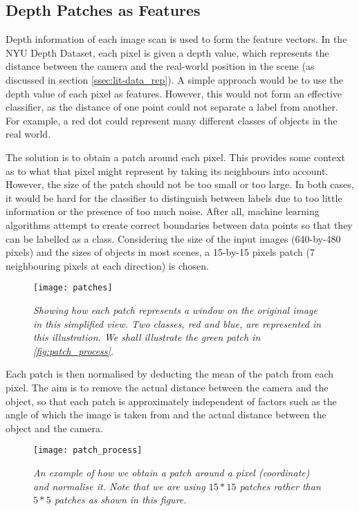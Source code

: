 \subsection{Depth Patches as Features}
Depth information of each image scan is used to form the feature vectors. In the NYU Depth Dataset, each pixel is given a depth value, which represents the distance between the camera and the real-world position in the scene (as discussed in section \ref{ssec:lit-data_rep}). A simple approach would be to use the depth value of each pixel as features. However, this would not form an effective classifier, as the distance of one point could not separate a label from another. For example, a red dot could represent many different classes of objects in the real world. 

The solution is to obtain a patch around each pixel. This provides some context as to what that pixel might represent by taking its neighbours into account. However, the size of the patch should not be too small or too large. In both cases, it would be hard for the classifier to distinguish between labels due to too little information or the presence of too much noise. After all, machine learning algorithms attempt to create correct boundaries between data points so that they can be labelled as a class. Considering the size of the input images (640-by-480 pixels) and the sizes of objects in most scenes, a 15-by-15 pixels patch (7 neighbouring pixels at each direction) is chosen.


\begin{figure}[H]
  \centering
  \texttt{[image: patches]}
  \caption{\textit{Showing how each patch represents a window on the original image in this simplified view. Two classes, red and blue, are represented in this illustration. We shall illustrate the green patch in \protect\autoref{fig:patch_process}.}}
  \label{fig:patches}
\end{figure}

Each patch is then normalised by deducting the mean of the patch from each pixel. The aim is to remove the actual distance between the camera and the object, so that each patch is approximately independent of factors such as the angle of which the image is taken from and the actual distance between the object and the camera. 

\begin{figure}[H]
  \centering
  \texttt{[image: patch\_process]}
  \caption{\textit{An example of how we obtain a patch around a pixel (coordinate) and normalise it. Note that we are using $15*15$ patches rather than $5*5$ patches as shown in this figure.}}
  \label{fig:patch_process}
\end{figure}

